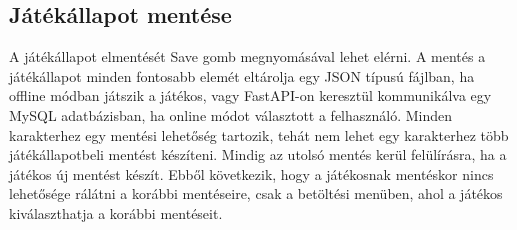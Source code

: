 \subsection{Játékállapot mentése} \label{subsec:Játékállapot mentése}
 A játékállapot elmentését Save gomb megnyomásával lehet elérni. A mentés a játékállapot minden fontosabb elemét eltárolja egy JSON típusú fájlban, ha offline módban játszik a játékos, vagy FastAPI-on \cite{fastapi} keresztül kommunikálva egy MySQL \cite{mysql} adatbázisban, ha online módot választott a felhasználó. 
Minden karakterhez egy mentési lehetőség tartozik, tehát nem lehet egy karakterhez több játékállapotbeli mentést készíteni. Mindig az utolsó mentés kerül felülírásra, ha a játékos új mentést készít. Ebből következik, hogy a játékosnak mentéskor nincs lehetősége rálátni a korábbi mentéseire, csak a betöltési menüben, ahol a játékos kiválaszthatja a korábbi mentéseit.

